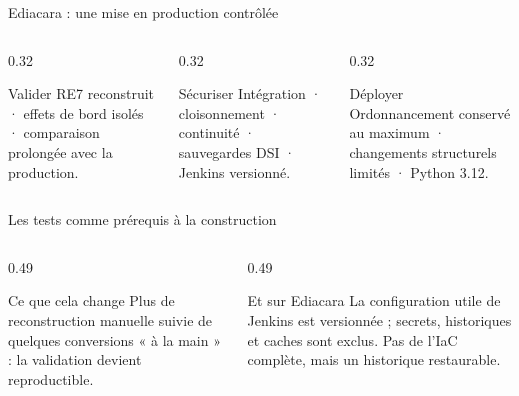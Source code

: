 \begin{frame}{Ediacara : une mise en production contrôlée}
\begin{center}
\hfill
{}\hfill
{}\hfill
{}
\end{center}
\vspace{0.7em}
\begin{columns}[T]
\begin{column}{0.32\linewidth}
\begin{block}{Valider}
\small RE7 reconstruit · effets de bord isolés · comparaison prolongée avec la production.
\end{block}
\end{column}
\begin{column}{0.32\linewidth}
\begin{block}{Sécuriser}
\small Intégration · cloisonnement · continuité · sauvegardes DSI · Jenkins versionné.
\end{block}
\end{column}
\begin{column}{0.32\linewidth}
\begin{block}{Déployer}
\small Ordonnancement conservé au maximum · changements structurels limités · Python 3.12.
\end{block}
\end{column}
\end{columns}
\end{frame}

\begin{frame}{Les tests comme prérequis à la construction}
\begin{center}
\end{center}
\vspace{0.25em}
\begin{columns}[T]
\begin{column}{0.49\linewidth}
\begin{block}{Ce que cela change}
\small Plus de reconstruction manuelle suivie de quelques conversions « à la main » : la validation devient reproductible.
\end{block}
\end{column}
\begin{column}{0.49\linewidth}
\begin{block}{Et sur Ediacara}
\small La configuration utile de Jenkins est versionnée ; secrets, historiques et caches sont exclus. Pas de l'IaC complète, mais un historique restaurable.
\end{block}
\end{column}
\end{columns}
\end{frame}

